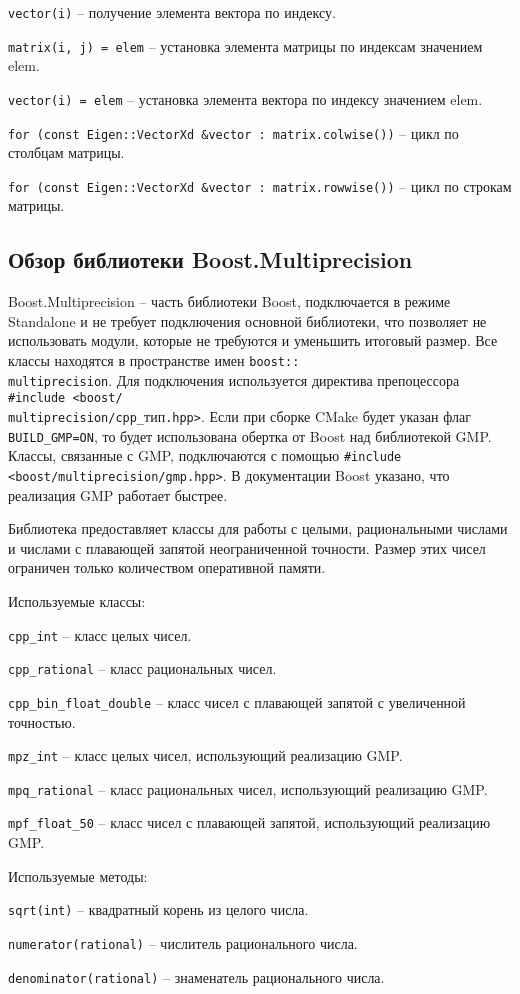 \verb!vector(i)! -- получение элемента вектора по индексу.

\verb!matrix(i, j) = elem! -- установка элемента матрицы по индексам значением elem.

\verb!vector(i) = elem! -- установка элемента вектора по индексу значением elem.

\verb!for (const Eigen::VectorXd &vector : matrix.colwise())! -- цикл по столбцам матрицы.

\verb!for (const Eigen::VectorXd &vector : matrix.rowwise())! -- цикл по строкам матрицы.

\subsection{Обзор библиотеки Boost.Multiprecision}

Boost.Multiprecision -- часть библиотеки Boost, подключается в режиме Standalone и не требует подключения основной библиотеки, что позволяет не использовать модули, которые не требуются и уменьшить итоговый размер. Все классы находятся в пространстве имен \verb!boost::!\\ \verb!multiprecision!. Для подключения используется директива препоцессора \verb!#include <boost/! \\ \verb!multiprecision/cpp_!тип\verb!.hpp>!. Если при сборке CMake будет указан флаг \verb!BUILD_GMP=ON!, то будет использована обертка от Boost над библиотекой GMP. Классы, связанные с GMP, подключаются с помощью \verb!#include <boost/multiprecision/gmp.hpp>!. В документации Boost указано, что реализация GMP работает быстрее.

Библиотека предоставляет классы для работы с целыми, рациональными числами и числами с плавающей запятой неограниченной точности. Размер этих чисел ограничен только количеством оперативной памяти. 

Используемые классы:

\verb!cpp_int! -- класс целых чисел.

\verb!cpp_rational! -- класс рациональных чисел.

\verb!cpp_bin_float_double! -- класс чисел с плавающей запятой с увеличенной точностью.

\verb!mpz_int! -- класс целых чисел, использующий реализацию GMP.

\verb!mpq_rational! -- класс рациональных чисел, использующий реализацию GMP.

\verb!mpf_float_50! -- класс чисел с плавающей запятой, использующий реализацию GMP.

Используемые методы:

\verb!sqrt(int)! -- квадратный корень из целого числа.

\verb!numerator(rational)! -- числитель рационального числа.

\verb!denominator(rational)! -- знаменатель рационального числа.

\clearpage